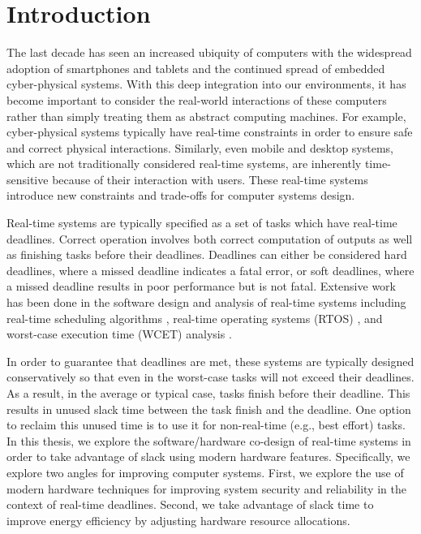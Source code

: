 \chapter{Introduction}
\label{chap:intro}

The last decade has seen an increased ubiquity of computers with the widespread
adoption of smartphones and tablets and the continued spread of embedded
cyber-physical systems. With this deep integration into our environments, it has
become important to consider the real-world interactions of these computers
rather than simply treating them as abstract computing machines. For example,
cyber-physical systems typically have real-time constraints in order to ensure
safe and correct physical interactions. Similarly, even mobile and desktop
systems, which are not traditionally considered real-time systems, are
inherently time-sensitive because of their interaction with users.
These real-time systems introduce new constraints and trade-offs for computer
systems design.

Real-time systems are typically specified as a set of tasks which have
real-time deadlines. Correct operation involves both correct computation of
outputs as well as finishing tasks before their deadlines.  Deadlines can
either be considered hard deadlines, where a missed deadline indicates a fatal
error, or soft deadlines, where a missed deadline results in poor performance
but is not fatal. Extensive work has been done in the software design and
analysis of real-time systems including real-time scheduling algorithms
\cite{rtschedulingsurvey-csur11}, real-time operating systems (RTOS)
\cite{rtossurvey-micro09, rtossurvey-icesc14}, and worst-case execution time
(WCET) analysis \cite{wcetsurvey-tecs08}.

In order to guarantee that deadlines are met, these systems are typically
designed conservatively so that even in the worst-case tasks will not exceed
their deadlines. As a result, in the average or typical case, tasks finish
before their deadline. This results in unused slack time between the task
finish and the deadline. One option to reclaim this unused time is to use it
for non-real-time (e.g., best effort) tasks. In this thesis, we explore the
software/hardware co-design of real-time systems in order to take advantage of
slack using modern hardware features. Specifically, we explore two angles for
improving computer systems. First, we explore the use of modern hardware
techniques for improving system security and reliability in the context of
real-time deadlines. Second, we take advantage of slack time to improve energy
efficiency by adjusting hardware resource allocations.

